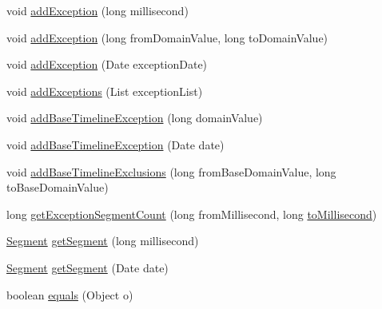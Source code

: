 \begin{DoxyCompactItemize}
\item 
void \mbox{\hyperlink{classorg_1_1jfree_1_1chart_1_1axis_1_1_segmented_timeline_a4c457d8df1c6dbdd54a298190410784c}{add\+Exception}} (long millisecond)
\item 
void \mbox{\hyperlink{classorg_1_1jfree_1_1chart_1_1axis_1_1_segmented_timeline_a7c2bb5c8de74738997bc84f368845563}{add\+Exception}} (long from\+Domain\+Value, long to\+Domain\+Value)
\item 
void \mbox{\hyperlink{classorg_1_1jfree_1_1chart_1_1axis_1_1_segmented_timeline_a667805b3155b5c6ce4857654fa01ed37}{add\+Exception}} (Date exception\+Date)
\item 
void \mbox{\hyperlink{classorg_1_1jfree_1_1chart_1_1axis_1_1_segmented_timeline_aae0346d4f75b9ee81d6345ffb7feb7b7}{add\+Exceptions}} (List exception\+List)
\item 
void \mbox{\hyperlink{classorg_1_1jfree_1_1chart_1_1axis_1_1_segmented_timeline_a8cc492f0f8af748393d3491ca80bc162}{add\+Base\+Timeline\+Exception}} (long domain\+Value)
\item 
void \mbox{\hyperlink{classorg_1_1jfree_1_1chart_1_1axis_1_1_segmented_timeline_ad5b28591221b3b9c2a50eaea48bc5e92}{add\+Base\+Timeline\+Exception}} (Date date)
\item 
void \mbox{\hyperlink{classorg_1_1jfree_1_1chart_1_1axis_1_1_segmented_timeline_ad6c2ee3c174c0bec87e5f860ebb14bae}{add\+Base\+Timeline\+Exclusions}} (long from\+Base\+Domain\+Value, long to\+Base\+Domain\+Value)
\item 
long \mbox{\hyperlink{classorg_1_1jfree_1_1chart_1_1axis_1_1_segmented_timeline_add03d94349ef61560939ab0c9776294d}{get\+Exception\+Segment\+Count}} (long from\+Millisecond, long \mbox{\hyperlink{classorg_1_1jfree_1_1chart_1_1axis_1_1_segmented_timeline_a734fc49f503e38b51902dbee8f27c060}{to\+Millisecond}})
\item 
\mbox{\hyperlink{classorg_1_1jfree_1_1chart_1_1axis_1_1_segmented_timeline_1_1_segment}{Segment}} \mbox{\hyperlink{classorg_1_1jfree_1_1chart_1_1axis_1_1_segmented_timeline_a4035b2f6b357508c3c30cc7ff83fd46e}{get\+Segment}} (long millisecond)
\item 
\mbox{\hyperlink{classorg_1_1jfree_1_1chart_1_1axis_1_1_segmented_timeline_1_1_segment}{Segment}} \mbox{\hyperlink{classorg_1_1jfree_1_1chart_1_1axis_1_1_segmented_timeline_afc06aca3eebe56d0ffbb6b4dbf3b555b}{get\+Segment}} (Date date)
\item 
boolean \mbox{\hyperlink{classorg_1_1jfree_1_1chart_1_1axis_1_1_segmented_timeline_aa7bbe6193eefeabcdd77eb523951b5fb}{equals}} (Object o)

\end{DoxyCompactItemize}
